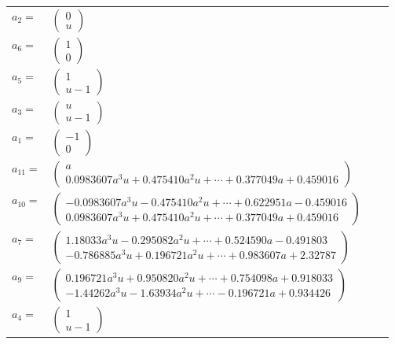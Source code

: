 \documentclass[1p]{elsarticle_modified}
\theoremstyle{definition}
\begin{document}
\begin{tabular}{m{7pt} m{180pt} m{7pt} m{180pt} }
\flushright $a_{2}=$&$\begin{pmatrix}0\\u\end{pmatrix}$ \\
\flushright $a_{6}=$&$\begin{pmatrix}1\\0\end{pmatrix}$ \\
\flushright $a_{5}=$&$\begin{pmatrix}1\\u-1\end{pmatrix}$ \\
\flushright $a_{3}=$&$\begin{pmatrix}u\\u-1\end{pmatrix}$ \\
\flushright $a_{1}=$&$\begin{pmatrix}-1\\0\end{pmatrix}$ \\
\flushright $a_{11}=$&$\begin{pmatrix}a\\0.0983607 a^{3} u+0.475410 a^{2} u+\cdots+0.377049 a+0.459016\end{pmatrix}$ \\
\flushright $a_{10}=$&$\begin{pmatrix}-0.0983607 a^{3} u-0.475410 a^{2} u+\cdots+0.622951 a-0.459016\\0.0983607 a^{3} u+0.475410 a^{2} u+\cdots+0.377049 a+0.459016\end{pmatrix}$ \\
\flushright $a_{7}=$&$\begin{pmatrix}1.18033 a^{3} u-0.295082 a^{2} u+\cdots+0.524590 a-0.491803\\-0.786885 a^{3} u+0.196721 a^{2} u+\cdots+0.983607 a+2.32787\end{pmatrix}$ \\
\flushright $a_{9}=$&$\begin{pmatrix}0.196721 a^{3} u+0.950820 a^{2} u+\cdots+0.754098 a+0.918033\\-1.44262 a^{3} u-1.63934 a^{2} u+\cdots-0.196721 a+0.934426\end{pmatrix}$ \\
\flushright $a_{4}=$&$\begin{pmatrix}1\\u-1\end{pmatrix}$ \\

\end{tabular}
\end{document}
